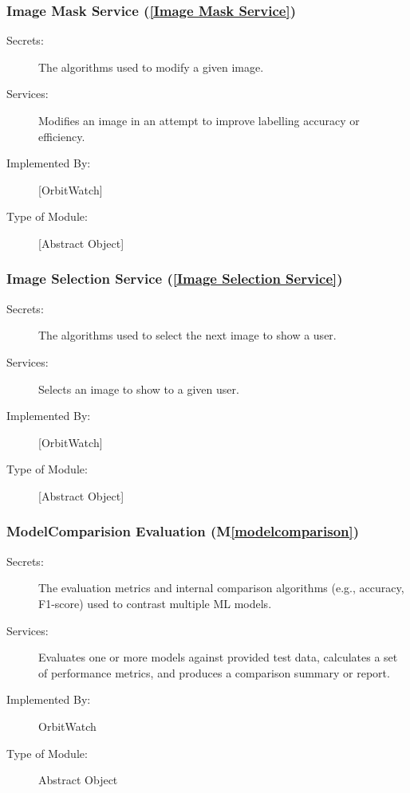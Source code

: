 \documentclass[12pt, titlepage]{article}
\newcommand{\mref}[1]{M\ref{#1}}
\begin{document}
\subsubsection{Image Mask Service (\ref{Image Mask Service})}
\begin{description}
\item[Secrets:] The algorithms used to modify a given image.
\item[Services:] Modifies an image in an attempt to improve labelling accuracy or efficiency.
\item[Implemented By:] [OrbitWatch]
\item[Type of Module:] [Abstract Object]
\end{description}

\subsubsection{Image Selection Service (\ref{Image Selection Service})}
\begin{description}
\item[Secrets:] The algorithms used to select the next image to show a user.
\item[Services:] Selects an image to show to a given user. 
\item[Implemented By:] [OrbitWatch]
\item[Type of Module:] [Abstract Object]
\end{description}

\subsubsection{ModelComparision Evaluation (\mref{modelcomparison})}
\begin{description}
  \item[Secrets:] 
    The evaluation metrics and internal comparison algorithms (e.g., accuracy, F1-score)
    used to contrast multiple ML models.
  \item[Services:] 
    Evaluates one or more models against provided test data, calculates a set of
    performance metrics, and produces a comparison summary or report.
  \item[Implemented By:] 
    OrbitWatch
  \item[Type of Module:] 
    Abstract Object
\end{description}
\end{document}
